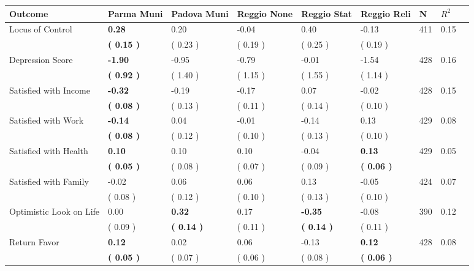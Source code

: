 \begin{tabular}{L{6.2cm} C{1.8cm} C{1.8cm} C{1.8cm} C{1.8cm} C{1.8cm} C{1.8cm} C{0.3cm} C{0.3cm}}
\toprule
 \textbf{Outcome} & \textbf{Parma Muni} & \textbf{Padova Muni} & \textbf{Reggio None} & \textbf{Reggio Stat} & \textbf{Reggio Reli} & \textbf{N} & \textbf{$ R^2$} \\
\midrule
Locus of Control & \textbf{     0.28} &      0.20 &     -0.04 &      0.40 &     -0.13  & 411 &       0.15 \\ 
 & \textbf{(     0.15 )} & (     0.23 ) & (     0.19 ) & (     0.25 ) & (     0.19 )  & \\
Depression Score & \textbf{    -1.90} &     -0.95 &     -0.79 &     -0.01 &     -1.54  & 428 &       0.16 \\ 
 & \textbf{(     0.92 )} & (     1.40 ) & (     1.15 ) & (     1.55 ) & (     1.14 )  & \\
Satisfied with Income & \textbf{    -0.32} &     -0.19 &     -0.17 &      0.07 &     -0.02  & 428 &       0.15 \\ 
 & \textbf{(     0.08 )} & (     0.13 ) & (     0.11 ) & (     0.14 ) & (     0.10 )  & \\
Satisfied with Work & \textbf{    -0.14} &      0.04 &     -0.01 &     -0.14 &      0.13  & 429 &       0.08 \\ 
 & \textbf{(     0.08 )} & (     0.12 ) & (     0.10 ) & (     0.13 ) & (     0.10 )  & \\
Satisfied with Health & \textbf{     0.10} &      0.10 &      0.10 &     -0.04 & \textbf{     0.13}  & 429 &       0.05 \\ 
 & \textbf{(     0.05 )} & (     0.08 ) & (     0.07 ) & (     0.09 ) & \textbf{(     0.06 )}  & \\
Satisfied with Family &     -0.02 &      0.06 &      0.06 &      0.13 &     -0.05  & 424 &       0.07 \\ 
 & (     0.08 ) & (     0.12 ) & (     0.10 ) & (     0.13 ) & (     0.10 )  & \\
Optimistic Look on Life &      0.00 & \textbf{     0.32} &      0.17 & \textbf{    -0.35} &     -0.08  & 390 &       0.12 \\ 
 & (     0.09 ) & \textbf{(     0.14 )} & (     0.11 ) & \textbf{(     0.14 )} & (     0.11 )  & \\
Return Favor & \textbf{     0.12} &      0.02 &      0.06 &     -0.13 & \textbf{     0.12}  & 428 &       0.08 \\ 
 & \textbf{(     0.05 )} & (     0.07 ) & (     0.06 ) & (     0.08 ) & \textbf{(     0.06 )}  & \\

\end{tabular}
